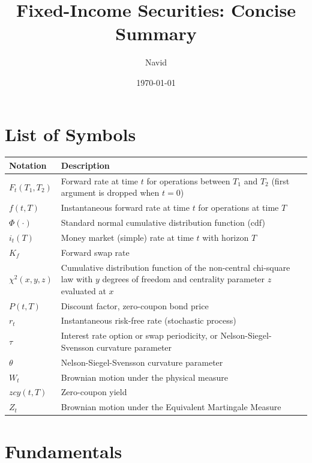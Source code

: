 \documentclass[12pt,a4paper]{article}
\title{Fixed-Income Securities: Concise Summary}
\author{Navid}
\date{\today}
\begin{document}
\setlength{\parindent}{0pt}

\maketitle
\tableofcontents

\section*{List of Symbols}
\vspace{0.5em}

\begin{tabular}{p{3cm}p{11cm}}
\hline
\textbf{Notation} & \textbf{Description} \\
\hline
$F_t(T_1, T_2)$ & Forward rate at time $t$ for operations between $T_1$ and $T_2$ (first argument is dropped when $t = 0$) \\
$f(t, T)$ & Instantaneous forward rate at time $t$ for operations at time $T$ \\
$\Phi(\cdot)$ & Standard normal cumulative distribution function (cdf) \\
$i_t(T)$ & Money market (simple) rate at time $t$ with horizon $T$ \\
$K_f$ & Forward swap rate \\
$\chi^2(x, y, z)$ & Cumulative distribution function of the non-central chi-square law with $y$ degrees of freedom and centrality parameter $z$ evaluated at $x$ \\
$P(t, T)$ & Discount factor, zero-coupon bond price \\
$r_t$ & Instantaneous risk-free rate (stochastic process) \\
$\tau$ & Interest rate option or swap periodicity, or Nelson-Siegel-Svensson curvature parameter \\
$\theta$ & Nelson-Siegel-Svensson curvature parameter \\
$W_t$ & Brownian motion under the physical measure \\
$zcy(t, T)$ & Zero-coupon yield \\
$Z_t$ & Brownian motion under the Equivalent Martingale Measure \\
\hline
\end{tabular}
\vspace{0.5em}

\section{Fundamentals}
\end{document}
